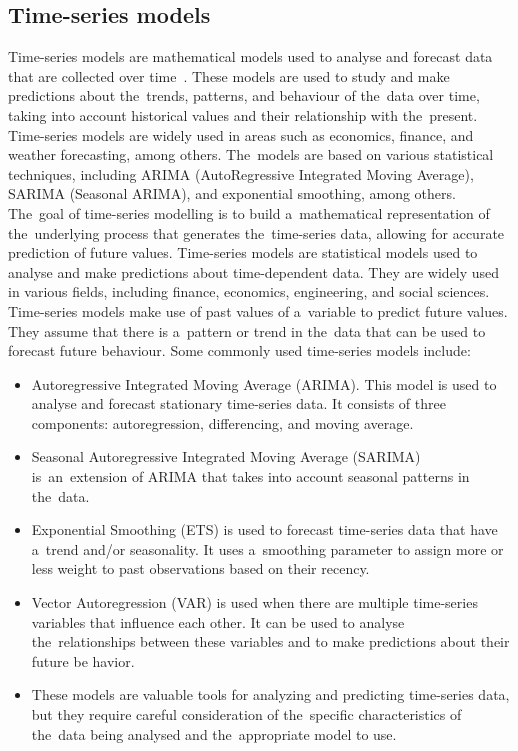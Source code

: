 \subsection{Time-series models}\label{sec:timeseries}
Time-series models are mathematical models used to analyse and forecast data that are collected over time~\cite{Cryer}.
These models are used to study and make predictions about the~trends, patterns, and behaviour of the~data over time,
taking into account historical values and their relationship with the~present. Time-series models are widely
used in areas such as economics, finance, and weather forecasting, among others. The~models are based on various
statistical techniques, including ARIMA (AutoRegressive Integrated Moving Average), SARIMA (Seasonal ARIMA),
and exponential smoothing, among others. The~goal of time-series modelling is to build a~mathematical representation
of the~underlying process that generates the~time-series data, allowing for accurate prediction of future values.
Time-series models are statistical models used to analyse and make predictions about time-dependent data. They are
widely used in various fields, including finance, economics, engineering, and social sciences.
\\
Time-series models make use of past values of a~variable to predict future values.
They assume that there is a~pattern or trend in the~data that can be used to forecast future behaviour.
Some commonly used time-series models include:
\begin{itemize}
    \item Autoregressive Integrated Moving Average (ARIMA). This model is used to analyse and forecast stationary
    time-series data. It consists of three components: autoregression, differencing, and moving average.
    \item Seasonal Autoregressive Integrated Moving Average (SARIMA) is~an~extension of ARIMA
    that takes into account seasonal patterns in the~data.
    \item Exponential Smoothing (ETS) is used to forecast time-series data that have a~trend
    and/or seasonality. It uses a~smoothing parameter to assign more or less weight to past observations
    based on their recency.
    \item Vector Autoregression (VAR) is used when there are multiple time-series variables
    that influence each other. It can be used to analyse the~relationships between these variables and to make
    predictions about their future be   havior.
    \item These models are valuable tools for analyzing and predicting time-series data, but they require careful
    consideration of the~specific characteristics of the~data being analysed and the~appropriate model to use.
\end{itemize}

